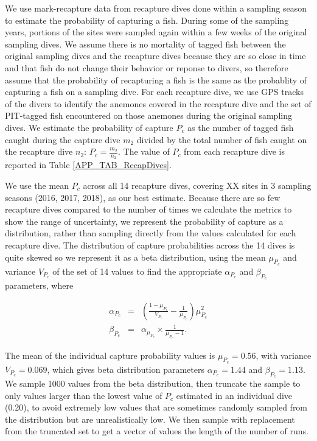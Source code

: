 \documentclass[12pt, oneside]{article}   	%
\begin{document}
We use mark-recapture data from recapture dives done within a sampling season to estimate the probability of capturing a fish. During some of the sampling years, portions of the sites were sampled again within a few weeks of the original sampling dives. We assume there is no mortality of tagged fish between the original sampling dives and the recapture dives because they are so close in time and that fish do not change their behavior or reponse to divers, so therefore assume that the probability of recapturing a fish is the same as the probablity of capturing a fish on a sampling dive. For each recapture dive, we use GPS tracks of the divers to identify the anemones covered in the recapture dive and the set of PIT-tagged fish encountered on those anemones during the original sampling dives. We estimate the probability of capture $P_c$ as the number of tagged fish caught during the capture dive $m_2$ divided by the total number of fish caught on the recapture dive $n_2$: $P_c = \frac{m_2}{n_2}$. The value of $P_c$ from each recapture dive is reported in Table \ref{APP_TAB_RecapDives}.

We use the mean $P_c$ across all 14 recapture dives, covering XX sites in 3 sampling seasons (2016, 2017, 2018), as our best estimate. Because there are so few recapture dives compared to the number of times we calculate the metrics to show the range of uncertainty, we represent the probability of capture as a distribution, rather than sampling directly from the values calculated for each recapture dive. The distribution of capture probabilities across the 14 dives is quite skewed so we represent it as a beta distribution, using the mean $\mu_{P_c}$ and variance $V_{P_c}$ of the set of 14 values to find the appropriate $\alpha_{P_c}$ and $\beta_{P_c}$ parameters, where 

\begin{eqnarray}
\alpha_{P_c} &=& (\frac{1-\mu_{P_c}}{V_{P_c}} - \frac{1}{\mu_{P_c}}) \mu_{P_c}^2 \\
\beta_{P_c} &=& \alpha_{\mu_{P_c}} \times \frac{1}{\mu_{P_c} - 1}. \label{APP_EQN_ProbCapBetaDistParams}  %
\end{eqnarray}

The mean of the individual capture probability values is $\mu_{P_c} = 0.56$, with variance $V_{P_c} = 0.069$, which gives beta distribution parameters $\alpha_{P_c} = 1.44$ and $\beta_{P_c} = 1.13$. We sample 1000 values from the beta distribution, then truncate the sample to only values larger than the lowest value of $P_c$ estimated in an individual dive (0.20), to avoid extremely low values that are sometimes randomly sampled from the distribution but are unrealistically low. We then sample with replacement from the truncated set to get a vector of values the length of the number of runs.
\end{document}
